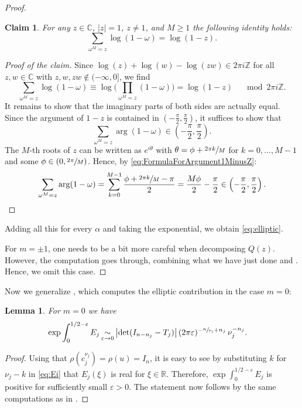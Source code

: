 \documentclass[10pt]{amsart}
\newcommand{\simm}{\mathop{\sim}\displaylimits}
\theoremstyle{plain}
\newtheorem{lem}[thm]{Lemma}
\newtheorem*{claim}{Claim}
\theoremstyle{definition}
\theoremstyle{remark}
\newcommand{\R}{\mathbb{R}}
\newcommand{\Z}{\mathbb{Z}}
\newcommand{\C}{\mathbb{C}}
\numberwithin{equation}{section}
\begin{document}
\begin{proof}
\begin{claim}
For any $z\in\C$, $|z|=1$, $z\neq1$, and $M\geq1$ the following identity holds:
\begin{equation}
\sum_{\omega^M = z} \log (1-\omega) = \log (1-z).
\end{equation}
\end{claim}
\begin{proof}[Proof of the claim]
Since $\log(z)+\log(w)-\log(zw)\in2\pi i\Z$ for all $z,w\in\C$ with $z,w,zw\not\in(-\infty,0]$, we find
\[
\sum_{\omega^M = z} \log (1-\omega) \equiv \log\Big(\prod_{\omega^M = z} (1-\omega)\Big) = \log (1-z) \quad \mod 2\pi i\Z.
\]
It remains to show that the imaginary parts of both sides are actually equal. Since the argument of $1-z$ is contained in $(-\frac{\pi}{2},\frac{\pi}{2})$, it suffices to show that
\[
\sum_{\omega^M = z}\arg (1-\omega) \in \left(-\frac{\pi}{2},\frac{\pi}{2}\right).
\]
The $M$-th roots of $z$ can be written as $e^{i\theta}$ with $\theta=\phi+\sfrac{2\pi k}{M}$ for $k=0,\ldots,M-1$ and some $\phi\in(0,\sfrac{2\pi}{M})$. Hence, by \cref{eq:FormulaForArgument1MinusZ}:
\begin{equation*}
\sum_{\omega^M = z}\arg (1-\omega) = \sum_{k=0}^{M-1} \frac{\phi+\sfrac{2\pi k}{M}-\pi}{2} = \frac{M\phi}{2}-\frac{\pi}{2} \in \left(-\frac{\pi}{2},\frac{\pi}{2}\right).\qedhere
\end{equation*}
\end{proof}

\noindent
Adding all this for every $\alpha$ and taking the exponential, we obtain \cref{eq:elliptic}.

For $m=\pm 1$, one needs to be a bit more careful when decomposing $Q(z)$. However, the computation goes through, combining what we have just done and \cite[\S 3]{fried1986fuchsian}.
Hence, we omit this case.
\end{proof}

Now we generalize \cite[Lem.\,6]{fried1986fuchsian}, which computes the elliptic contribution in the case $m=0$:

\begin{lem}
\label{lem3}
For $m=0$ we have
\begin{align}\label{eq:elliptic2}
\exp\int_0^{1/2-\varepsilon} E_j &\simm_{\varepsilon \to 0} \left|{\det} (I_{n-n_j} -T_j)\right| (2\pi\varepsilon)^{-\sfrac n {\nu_j} + n_j}\, \nu_j^{-n_j}.
\end{align}
\end{lem}

\begin{proof}
Using that $\rho(c_j^{\nu_j})=\rho(u)=I_n$, it is easy to see by substituting $k$ for $\nu_j-k$ in \cref{eq:Ei} that $E_j(\xi)$ is real for $\xi\in\R$. Therefore, $\exp\int_0^{1/2-\varepsilon}E_j$ is positive for sufficiently small $\varepsilon>0$. The statement now follows by the same computations as in \cite[proof of Lem.\,6]{fried1986fuchsian}.
\end{proof}
\end{document}
